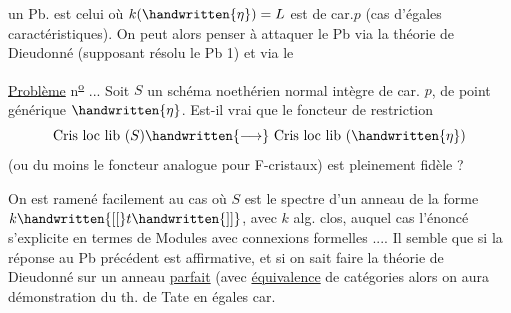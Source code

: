 un Pb. est celui où $k(\handwritten{\eta})=L$ est de car.$p$ (cas d'égales caractéristiques).
On peut alors penser à attaquer le Pb via la théorie de Dieudonné (supposant résolu le Pb 1) et via le

\uline{Problème} n\textsuperscript{\uline{o}} ... Soit $S$ un schéma noethérien normal  intègre de car.
$p$, de point générique $\handwritten{\eta}$. Est-il vrai que le foncteur de restriction
\[
\text{Cris loc lib }(S)\handwritten{\longrightarrow}\text{ Cris loc lib }(\handwritten{\eta})
\]
(ou du moins le foncteur analogue pour F-cristaux) est pleinement fidèle ?

On est ramené facilement au cas où $S$ est le spectre d'un anneau de
la forme $k\handwritten{[[}t\handwritten{]]}$, avec $k$ alg. clos, auquel cas l'énoncé s'explicite en
termes de Modules avec connexions formelles .... Il semble que si la réponse au Pb précédent est affirmative,  et si on sait faire la
théorie de Dieudonné sur un anneau \uline{parfait} (avec \uline{équivalence} de catégories
alors on aura démonstration du th. de Tate en égales car.

